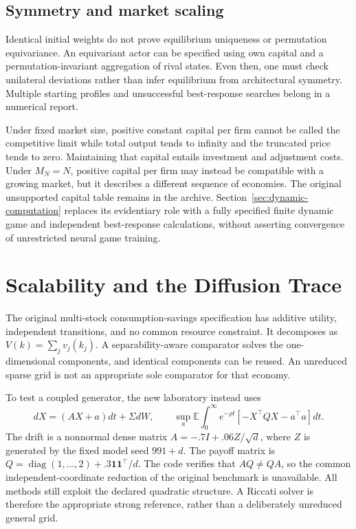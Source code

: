 \documentclass[ecta,draft]{econsocart}
\theoremstyle{definition}
\theoremstyle{remark}
\newcommand{\E}{\mathbb E}
\begin{document}
\subsection{Symmetry and market scaling}
Identical initial weights do not prove equilibrium uniqueness or permutation equivariance. An equivariant actor can be specified using own capital and a permutation-invariant aggregation of rival states. Even then, one must check unilateral deviations rather than infer equilibrium from architectural symmetry. Multiple starting profiles and unsuccessful best-response searches belong in a numerical report.

Under fixed market size, positive constant capital per firm cannot be called the competitive limit while total output tends to infinity and the truncated price tends to zero. Maintaining that capital entails investment and adjustment costs. Under $M_N=N$, positive capital per firm may instead be compatible with a growing market, but it describes a different sequence of economies. The original unsupported capital table remains in the archive. Section~\ref{sec:dynamic-computation} replaces its evidentiary role with a fully specified finite dynamic game and independent best-response calculations, without asserting convergence of unrestricted neural game training.



\section{Scalability and the Diffusion Trace}\label{sec:scaling}
The original multi-stock consumption-savings specification has additive utility, independent transitions, and no common resource constraint. It decomposes as $V(k)=\sum_jv_j(k_j)$. A separability-aware comparator solves the one-dimensional components, and identical components can be reused. An unreduced sparse grid is not an appropriate sole comparator for that economy.

To test a coupled generator, the new laboratory instead uses
\begin{equation}\label{eq:lq}
 dX=(AX+a)dt+\Sigma dW,\qquad
 \sup_a\E\int_0^\infty e^{-\rho t}[-X^\top QX-a^\top a]dt.
\end{equation}
The drift is a nonnormal dense matrix $A=-.7I+.06Z/\sqrt d$, where $Z$ is generated by the fixed model seed $991+d$. The payoff matrix is $Q=\operatorname{diag}(1,\ldots,2)+.3\bm1\bm1^\top/d$. The code verifies that $AQ\ne QA$, so the common independent-coordinate reduction of the original benchmark is unavailable. All methods still exploit the declared quadratic structure. A Riccati solver is therefore the appropriate strong reference, rather than a deliberately unreduced general grid.
\end{document}
